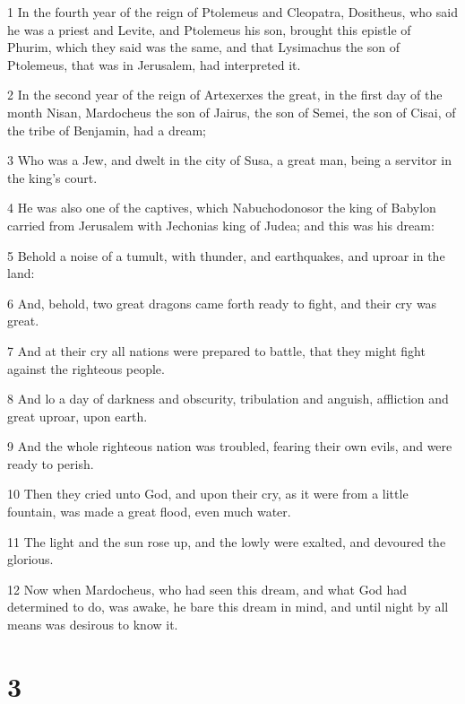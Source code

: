 \par 1 In the fourth year of the reign of Ptolemeus and Cleopatra, Dositheus, who said he was a priest and Levite, and Ptolemeus his son, brought this epistle of Phurim, which they said was the same, and that Lysimachus the son of Ptolemeus, that was in Jerusalem, had interpreted it.
\par 2 In the second year of the reign of Artexerxes the great, in the first day of the month Nisan, Mardocheus the son of Jairus, the son of Semei, the son of Cisai, of the tribe of Benjamin, had a dream;
\par 3 Who was a Jew, and dwelt in the city of Susa, a great man, being a servitor in the king's court.
\par 4 He was also one of the captives, which Nabuchodonosor the king of Babylon carried from Jerusalem with Jechonias king of Judea; and this was his dream:
\par 5 Behold a noise of a tumult, with thunder, and earthquakes, and uproar in the land:
\par 6 And, behold, two great dragons came forth ready to fight, and their cry was great.
\par 7 And at their cry all nations were prepared to battle, that they might fight against the righteous people.
\par 8 And lo a day of darkness and obscurity, tribulation and anguish, affliction and great uproar, upon earth.
\par 9 And the whole righteous nation was troubled, fearing their own evils, and were ready to perish.
\par 10 Then they cried unto God, and upon their cry, as it were from a little fountain, was made a great flood, even much water.
\par 11 The light and the sun rose up, and the lowly were exalted, and devoured the glorious.
\par 12 Now when Mardocheus, who had seen this dream, and what God had determined to do, was awake, he bare this dream in mind, and until night by all means was desirous to know it.

\chapter{3}

